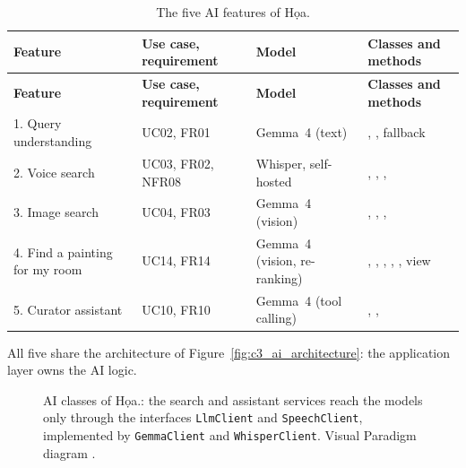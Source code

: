 \begin{longtable}{@{}P{3.3cm}P{2.3cm}P{2.6cm}P{6.8cm}@{}}
\caption{The five AI features of Họa.}\label{tab:fiveai}\\
\toprule
\textbf{Feature} & \textbf{Use case, requirement} & \textbf{Model} & \textbf{Classes and methods}\\
\midrule
\endfirsthead
\toprule
\textbf{Feature} & \textbf{Use case, requirement} & \textbf{Model} & \textbf{Classes and methods}\\
\midrule
\endhead
\small 1. Query understanding & \small UC02, FR01 & \small Gemma~4 (text) & \small {}, , fallback \\
\small 2. Voice search & \small UC03, FR02, NFR08 & \small Whisper, self-hosted & \small {}, , , \\
\small 3. Image search & \small UC04, FR03 & \small Gemma~4 (vision) & \small {}, , , \\
\small 4. Find a painting for my room & \small UC14, FR14 & \small Gemma~4 (vision, re-ranking) & \small {}, , , , , view \\
\small 5. Curator assistant & \small UC10, FR10 & \small Gemma~4 (tool calling) & \small {}, , \\
\bottomrule
\end{longtable}

All five share the architecture of Figure~\ref{fig:c3_ai_architecture}: the application layer owns the AI logic.

\begin{figure}[htbp]
\centering
{}
\caption[AI classes of Họa.]{AI classes of Họa.: the search and assistant services reach the models only
through the interfaces \texttt{LlmClient} and \texttt{SpeechClient}, implemented by \texttt{GemmaClient} and
\texttt{WhisperClient}. Visual Paradigm diagram .}
\label{fig:c3_ai_architecture}\label{fig:aiarch}
\end{figure}

